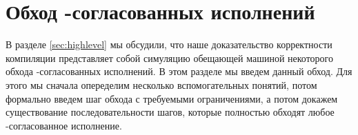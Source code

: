


\section{Обход \ARM-согласованных исполнений}
\label{sec:traversal}

В разделе \ref{sec:highlevel} мы обсудили, что наше доказательство корректности компиляции представляет
собой симуляцию обещающей машиной некоторого обхода \ARM-согласованных исполнений. В этом разделе
мы введем данный обход. Для этого мы сначала опеределим несколько вспомогательных понятий,
потом формально введем шаг обхода с требуемыми ограничениями, а потом докажем существование
последовательности шагов, которые полностью обходят любое \ARM-согласованное исполнение.

